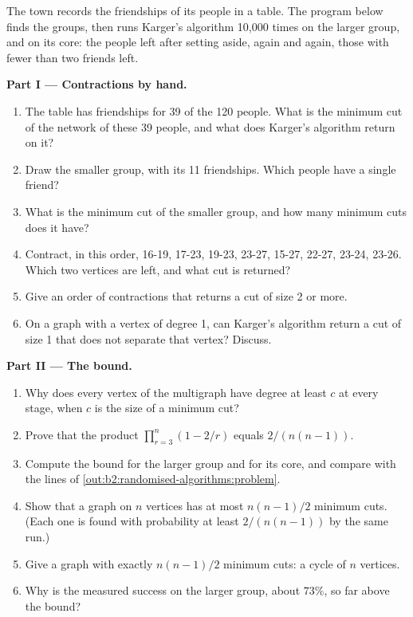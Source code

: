 \begin{problem}\label{pb:b2:randomised-algorithms:1}
The town records the friendships of its people in a table. The program below finds the groups, then runs Karger's
algorithm 10,000 times on the larger group, and on its core: the people left after setting aside, again and again,
those with fewer than two friends left.

\label{out:b2:randomised-algorithms:problem}

\medskip\noindent\textbf{Part I --- Contractions by hand.}\par\nopagebreak
\begin{enumerate}
\item The table has friendships for 39 of the 120 people. What is the minimum cut of the network of these 39 people, and
what does Karger's algorithm return on it?
\item Draw the smaller group, with its 11 friendships. Which people have a single friend?
\item What is the minimum cut of the smaller group, and how many minimum cuts does it have?
\item Contract, in this order, 16-19, 17-23, 19-23, 23-27, 15-27, 22-27, 23-24, 23-26. Which two vertices are left, and
what cut is returned?
\item Give an order of contractions that returns a cut of size 2 or more.
\item On a graph with a vertex of degree 1, can Karger's algorithm return a cut of size 1 that does not separate that
vertex? Discuss.
\end{enumerate}

\medskip\noindent\textbf{Part II --- The bound.}\par\nopagebreak
\begin{enumerate}[resume, beginpenalty=10000]
\item Why does every vertex of the multigraph have degree at least $c$ at every stage, when $c$ is the size of a minimum
cut?
\item Prove that the product $\prod_{r = 3}^{n} (1 - 2/r)$ equals $2/(n(n - 1))$.
\item Compute the bound for the larger group and for its core, and compare with the lines of
\cref{out:b2:randomised-algorithms:problem}.
\item Show that a graph on $n$ vertices has at most $n(n - 1)/2$ minimum cuts. (Each one is found with probability at
least $2/(n(n - 1))$ by the same run.)
\item Give a graph with exactly $n(n - 1)/2$ minimum cuts: a cycle of $n$ vertices.
\item Why is the measured success on the larger group, about $73\%$, so far above the bound?
\end{enumerate}


\end{problem}
